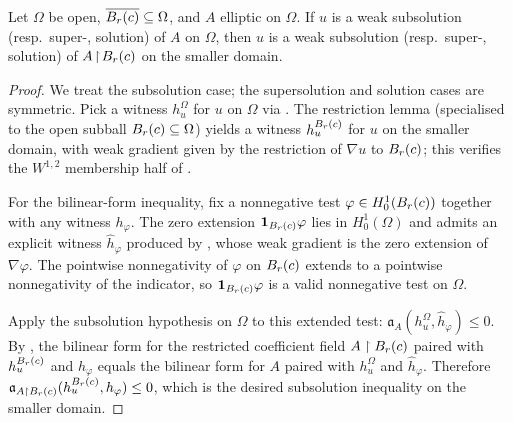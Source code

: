\begin{theorem}
\label{thm:IsSubsolution_restrict_ball}
\leanok
{}
Let $\Omega$ be open, $\overline{B_{r}(c)} \subseteq \Omega$, and $A$ elliptic on $\Omega$. If $u$ is a weak subsolution (resp.\ super-, solution) of $A$ on $\Omega$, then $u$ is a weak subsolution (resp.\ super-, solution) of $A\!\restriction\!B_{r}(c)$ on the smaller domain.
\end{theorem}

\begin{proof}
\leanok
{}

We treat the subsolution case; the supersolution and solution cases are
symmetric. Pick a witness $h_u^{\Omega}$ for $u$ on $\Omega$ via
. The restriction lemma
 (specialised to the open subball
$B_{r}(c) \subseteq \Omega$) yields a witness $h_u^{B_{r}(c)}$ for $u$
on the smaller domain, with weak gradient given by the restriction of
$\nabla u$ to $B_{r}(c)$; this verifies the $W^{1,2}$ membership half of
.

For the bilinear-form inequality, fix a nonnegative test
$\varphi \in H^{1}_{0}(B_{r}(c))$ together with any witness $h_\varphi$.
The zero extension $\mathbf{1}_{B_{r}(c)}\varphi$ lies in $H^{1}_{0}(\Omega)$
and admits an explicit witness $\hat h_\varphi$ produced by
, whose weak gradient is the zero
extension of $\nabla \varphi$. The pointwise nonnegativity of $\varphi$ on
$B_{r}(c)$ extends to a pointwise nonnegativity of the indicator, so
$\mathbf{1}_{B_{r}(c)}\varphi$ is a valid nonnegative test on $\Omega$.

Apply the subsolution hypothesis on $\Omega$ to this extended test:
$\mathfrak{a}_{A}(h_u^{\Omega}, \hat h_\varphi) \le 0$. By
, the bilinear form for
the restricted coefficient field $A\restriction B_{r}(c)$ paired with
$h_u^{B_{r}(c)}$ and $h_\varphi$ equals the bilinear form for $A$ paired
with $h_u^{\Omega}$ and $\hat h_\varphi$. Therefore
$\mathfrak{a}_{A\restriction B_{r}(c)}(h_u^{B_{r}(c)}, h_\varphi) \le 0$,
which is the desired subsolution inequality on the smaller domain.
\end{proof}

